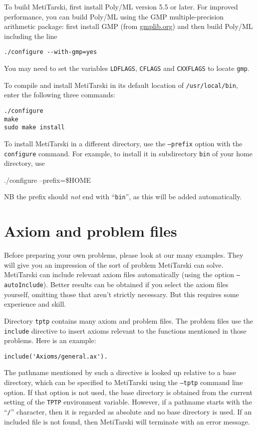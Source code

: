 \documentclass[a4paper,11pt]{scrartcl}
\begin{document}
To build MetiTarski, first install Poly/ML version 5.5 or later.
For improved performance, you can build Poly/ML using the GMP multiple-precision arithmetic package: first install GMP (from \url{gmplib.org}) and then build Poly/ML including the line
\begin{verbatim}
./configure --with-gmp=yes
\end{verbatim}
%
You may need to set the variables \texttt{LDFLAGS}, \texttt{CFLAGS} and \texttt{CXXFLAGS} to locate \texttt{gmp}.

To compile and install MetiTarski in its default location of \texttt{/usr/local/bin}, enter the
following three commands:
\begin{verbatim}
./configure
make
sudo make install
\end{verbatim}

To install MetiTarski in a different directory, use the \texttt{--prefix} option with the \texttt{configure}
command. For example, to install it in subdirectory \texttt{bin} of your home directory, use
\begin{flushleft}\ttfamily
./configure --prefix=\$HOME
\end{flushleft}
%
NB the prefix should \textit{not} end with ``\texttt{bin}'', as this will be added automatically.

\section{Axiom and problem files}

Before preparing your own problems, please look at our many examples.
They will give you an impression of the sort of problem MetiTarski can solve.
MetiTarski can include relevant axiom files automatically (using the
option \texttt{--autoInclude}). Better results can be obtained if you select the axiom files
yourself, omitting those that aren't strictly necessary. But this requires
some experience and skill.

Directory \texttt{tptp} contains many axiom and problem files. The problem files use the
\texttt{include} directive to insert axioms relevant to the functions mentioned in
those problems. Here is an example:

\begin{verbatim}
include('Axioms/general.ax').
\end{verbatim}

The pathname mentioned by such a directive is looked up relative
to a base directory, which can be specified to MetiTarski using the \texttt{--tptp}
command line option. If that option is not used, the base directory is obtained
from the current setting of the \texttt{TPTP} environment variable.  However, if a
pathname starts with the ``\texttt{/}'' character, then it is regarded as absolute and no
base directory is used. If an included file is not found, then MetiTarski will
terminate with an error message.
\end{document}
